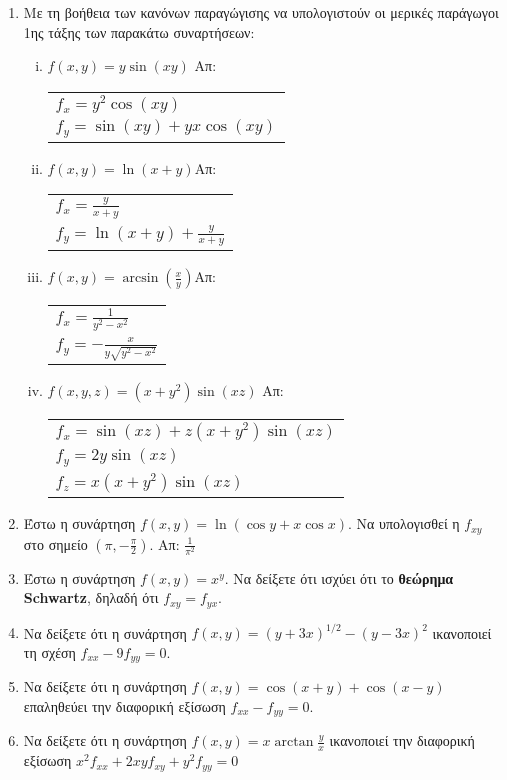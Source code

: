 \begin{enumerate}
  \item Με τη βοήθεια των κανόνων παραγώγισης να υπολογιστούν οι μερικές 
    παράγωγοι 1ης τάξης των παρακάτω συναρτήσεων:

    \begin{enumerate}[i)]
      \item $f(x,y)=y\sin (xy)$ \hfill Απ: \begin{tabular}{l}
          $f_x=y^2\cos(xy)$ \\ 
          $f_y=\sin(xy)+yx\cos(xy)$
        \end{tabular}

      \item $f(x,y)=\ln(x+y)$\hfill Απ: \begin{tabular}{l}
          $f_x=\frac{y}{x+y}$ \\ 
          $f_y=\ln(x+y)+\frac{y}{x+y}$
        \end{tabular}

      \item $f(x,y)=\arcsin(\frac{x}{y})$\hfill Απ: \begin{tabular}{l}
          $f_x=\frac{1}{y^2-x^2}$ \\ 
          $f_y=-\frac{x}{y\sqrt{y^2-x^2}}$
        \end{tabular}
      \item $ f(x,y,z) = (x+y^{2}) \sin{(xz)} $ \hfill Απ: \begin{tabular}{l}
          $ f_{x} = \sin{(xz)} + z(x+y^{2}) \sin{(xz)} $ \\
          $ f_{y} = 2y \sin{(xz)} $ \\
          $ f_{z} = x(x+y^{2}) \sin{(xz)} $
        \end{tabular} 
    \end{enumerate}

  \item Έστω η συνάρτηση $f(x,y)=\ln\left(\cos y+x\cos x\right)$.  Να υπολογισθεί 
    η $ f_{xy} $ στο σημείο $\left(\pi,-\frac{\pi}{2}\right)$.
    \hfill Απ: $\frac{1}{\pi^2}$

  \item Έστω η συνάρτηση $ f(x,y) = x^{y} $. Να δείξετε ότι ισχύει ότι το
    \textbf{θεώρημα Schwartz}, δηλαδή ότι $ f_{xy} = f_{yx} $.
  \item Να δείξετε ότι η συνάρτηση $ f(x,y) = (y+3x)^{1/2} - 
    (y-3x)^{2} $ ικανοποιεί τη σχέση $ f_{xx} - 9 f_{yy} = 0 $.
  \item Να δείξετε ότι η συνάρτηση $ f(x,y) = \cos{(x+y)} + \cos{(x-y)} $ 
    επαληθεύει την διαφορική εξίσωση $ f_{xx} - f_{yy} = 0 $.

  \item Να δείξετε ότι η συνάρτηση $ f(x,y) = x \arctan{\frac{y}{x}} $ 
    ικανοποιεί την διαφορική εξίσωση $ x^{2} f_{xx} + 2xyf_{xy} + y^{2} f_{yy} = 0 $ 
\end{enumerate}

